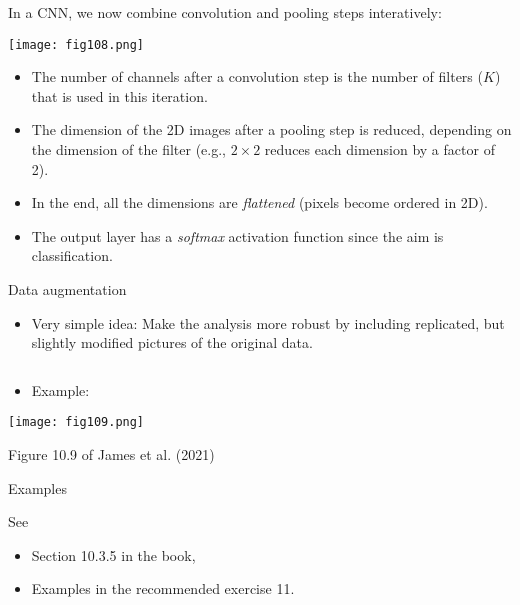 \documentclass[
  10pt,
  ignorenonframetext,
]{beamer}
\providecommand{\tightlist}{%
  \setlength{\itemsep}{0pt}\setlength{\parskip}{0pt}}
\begin{document}
\begin{frame}
In a CNN, we now combine convolution and pooling steps interatively:

\centering

\texttt{[image: fig108.png]}

\begin{itemize}
\item
  The number of channels after a convolution step is the number of
  filters (\(K\)) that is used in this iteration.
\item
  The dimension of the 2D images after a pooling step is reduced,
  depending on the dimension of the filter (e.g., \(2\times 2\) reduces
  each dimension by a factor of 2).
\item
  In the end, all the dimensions are \emph{flattened} (pixels become
  ordered in 2D).
\item
  The output layer has a \emph{softmax} activation function since the
  aim is classification.
\end{itemize}
\end{frame}

\begin{frame}
\begin{block}{Data augmentation}
\protect\hypertarget{data-augmentation}{}
\(~\)

\begin{itemize}
\tightlist
\item
  Very simple idea: Make the analysis more robust by including
  replicated, but slightly modified pictures of the original data.
\end{itemize}

\(~\)

\begin{itemize}
\tightlist
\item
  Example:
\end{itemize}

\texttt{[image: fig109.png]}

\scriptsize Figure 10.9 of James et al. (2021)
\end{block}
\end{frame}

\begin{frame}
\begin{block}{Examples}
\protect\hypertarget{examples}{}
\(~\)

See

\begin{itemize}
\item
  Section 10.3.5 in the book,
\item
  Examples in the recommended exercise 11.
\end{itemize}
\end{block}
\end{frame}
\end{document}
